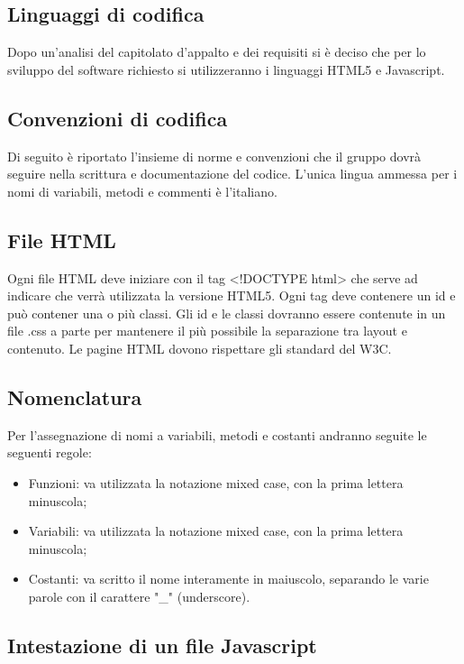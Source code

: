 \subsection{Linguaggi di codifica}
Dopo un'analisi del capitolato d'appalto e dei requisiti si è deciso che per lo sviluppo del software richiesto si utilizzeranno i linguaggi HTML5 e Javascript.

\subsection{Convenzioni di codifica}
Di seguito è riportato l'insieme di norme e convenzioni che il gruppo dovrà seguire nella scrittura e documentazione del codice.
L'unica lingua ammessa per i nomi di variabili, metodi e commenti è l'italiano.

\subsection{File HTML}

Ogni file HTML deve iniziare con il tag <!DOCTYPE html> che serve ad indicare che verrà utilizzata la versione HTML5.
Ogni tag deve contenere un id e può contener una o più classi.
Gli id e le classi dovranno essere contenute in un file .css a parte per mantenere il più possibile la separazione tra layout e contenuto.
Le pagine HTML dovono rispettare gli standard del W3C.

\subsection{Nomenclatura}
Per l'assegnazione di nomi a variabili, metodi e costanti andranno seguite le seguenti regole:
\begin{itemize}
	\item Funzioni: va utilizzata la notazione mixed case, con la prima lettera minuscola;
	\item Variabili: va utilizzata la notazione mixed case, con la prima lettera minuscola;
	\item Costanti: va scritto il nome interamente in maiuscolo, separando le varie parole con il carattere "\_" (underscore).
\end{itemize}

\subsection{Intestazione di un file Javascript}

